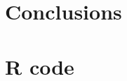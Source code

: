 \documentclass[
12pt, %
a4paper, %
oneside, %
headinclude,footinclude, %
BCOR5mm, %
]{scrartcl}
\begin{document}
\clearpage

\section{Conclusions}

\clearpage

\section{R code}
\begin{lstlisting}


\end{lstlisting}




\renewcommand{\refname}{\spacedlowsmallcaps{References}} %




\end{document}
